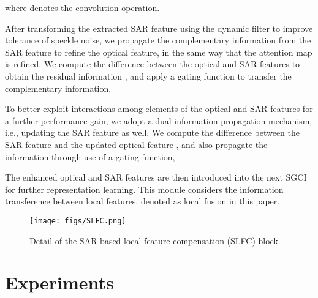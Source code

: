 \documentclass[a4paper,fleqn]{cas-dc}
\newcommand{\ie}[1]{{i.e.}}
\begin{document}
where  denotes the convolution operation. 



After transforming the extracted SAR feature  using the dynamic filter to improve tolerance of speckle noise, we propagate the complementary information from the SAR feature to refine the optical feature, in the same way that the attention map is refined. We compute the difference between the optical and SAR features to obtain the residual information , and apply a gating function to transfer the complementary information,

To better exploit interactions among elements of the optical and SAR features for a further performance gain, we adopt a dual information propagation
mechanism, \ie{}, updating the SAR feature as well. We compute the difference between the SAR feature and the updated optical feature , and also propagate the information through use of a gating function,

The enhanced optical and SAR features are then introduced into the next SGCI for further representation learning. This module considers the information transference between local features, denoted as local fusion in this paper.

\begin{figure}[!t]
	\centering
	\texttt{[image: figs/SLFC.png]}
	\caption{Detail of the SAR-based local feature compensation (SLFC) block. }
	\label{Fig-SLFC}
	\vspace{-5mm}
\end{figure}

\section{Experiments}
\end{document}
